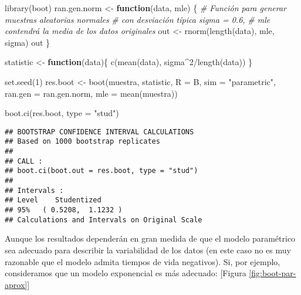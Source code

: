 \documentclass[
]{book}
\newenvironment{Shaded}{\begin{snugshade}}{\end{snugshade}}
\newcommand{\AttributeTok}[1]{\textcolor[rgb]{0.77,0.63,0.00}{#1}}
\newcommand{\CommentTok}[1]{\textcolor[rgb]{0.56,0.35,0.01}{\textit{#1}}}
\newcommand{\ControlFlowTok}[1]{\textcolor[rgb]{0.13,0.29,0.53}{\textbf{#1}}}
\newcommand{\DecValTok}[1]{\textcolor[rgb]{0.00,0.00,0.81}{#1}}
\newcommand{\FunctionTok}[1]{\textcolor[rgb]{0.00,0.00,0.00}{#1}}
\newcommand{\NormalTok}[1]{#1}
\newcommand{\OtherTok}[1]{\textcolor[rgb]{0.56,0.35,0.01}{#1}}
\newcommand{\SpecialCharTok}[1]{\textcolor[rgb]{0.00,0.00,0.00}{#1}}
\newcommand{\StringTok}[1]{\textcolor[rgb]{0.31,0.60,0.02}{#1}}
\theoremstyle{break}
\theoremstyle{definition}
\theoremstyle{definition}
\theoremstyle{definition}
\theoremstyle{definition}
\theoremstyle{remark}
\begin{document}
\begin{Shaded}
\begin{Highlighting}[]
\FunctionTok{library}\NormalTok{(boot)}
\NormalTok{ran.gen.norm }\OtherTok{\textless{}{-}} \ControlFlowTok{function}\NormalTok{(data, mle) \{}
    \CommentTok{\# Función para generar muestras aleatorias normales}
    \CommentTok{\# con desviación típica sigma = 0.6,}
    \CommentTok{\# mle contendrá la media de los datos originales}
\NormalTok{    out }\OtherTok{\textless{}{-}} \FunctionTok{rnorm}\NormalTok{(}\FunctionTok{length}\NormalTok{(data), mle, sigma)}
\NormalTok{    out}
\NormalTok{\}}

\NormalTok{statistic }\OtherTok{\textless{}{-}} \ControlFlowTok{function}\NormalTok{(data)\{}
    \FunctionTok{c}\NormalTok{(}\FunctionTok{mean}\NormalTok{(data), sigma}\SpecialCharTok{\^{}}\DecValTok{2}\SpecialCharTok{/}\FunctionTok{length}\NormalTok{(data))}
\NormalTok{\}}

\FunctionTok{set.seed}\NormalTok{(}\DecValTok{1}\NormalTok{)}
\NormalTok{res.boot }\OtherTok{\textless{}{-}} \FunctionTok{boot}\NormalTok{(muestra, statistic, }\AttributeTok{R =}\NormalTok{ B, }\AttributeTok{sim =} \StringTok{"parametric"}\NormalTok{,}
                 \AttributeTok{ran.gen =}\NormalTok{ ran.gen.norm, }\AttributeTok{mle =} \FunctionTok{mean}\NormalTok{(muestra))}

\FunctionTok{boot.ci}\NormalTok{(res.boot, }\AttributeTok{type =} \StringTok{"stud"}\NormalTok{)}
\end{Highlighting}
\end{Shaded}

\begin{verbatim}
## BOOTSTRAP CONFIDENCE INTERVAL CALCULATIONS
## Based on 1000 bootstrap replicates
## 
## CALL : 
## boot.ci(boot.out = res.boot, type = "stud")
## 
## Intervals : 
## Level    Studentized     
## 95%   ( 0.5208,  1.1232 )  
## Calculations and Intervals on Original Scale
\end{verbatim}

Aunque los resultados dependerán en gran medida de que el modelo paramétrico
sea adecuado para describir la variabilidad de los datos
(en este caso no es muy razonable que el modelo admita tiempos de vida negativos).
Si, por ejemplo, consideramos que un modelo exponencial es más adecuado: {[}Figura \ref{fig:boot-par-aprox}{]}
\end{document}
